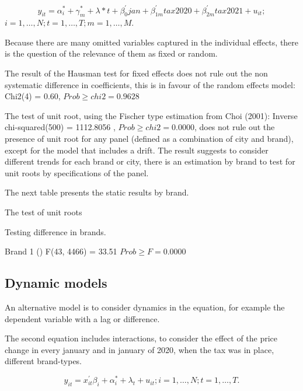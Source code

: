 \documentclass[]{article}
\begin{document}
\begin{equation*} 
	y_{it}  = \alpha_{i}^{*} + \gamma_{m}^{*} + \lambda*t + \beta_{0}^{'}jan + \beta_{1m}^{'}tax2020 + \beta_{2m}^{'}tax2021 + u_{it}
	;   \tag{4.2}
\end{equation*}
$i  = 1,\ldots,N;  t=1,\ldots,T; m=1,\ldots,M. $

Because there are many omitted variables captured in the individual effects, there is the question of the relevance of them as fixed or random.

The result of the Hausman test for fixed effects does not rule out the non systematic difference in coefficients, this is in favour of the random effects model: Chi2(4) =  0.60,
$Prob \geq chi2 =    0.9628$

The test of unit root, using the Fischer type estimation from Choi (2001): 
Inverse chi-squared(500) = 1112.8056 , $Prob \geq chi2 =    0.0000$, does not rule out the presence of unit root for any panel (defined as a combination of city and brand), except for the model that includes a drift. The result suggests to consider different trends for each brand or city, there is an estimation by brand to test for unit roots by specifications of the panel.

The next table presents the static results by brand.

\begin{landscape}

\end{landscape}

%
The test of unit roots

Testing difference in brands.

Brand 1 ()
 F(43, 4466) = 33.51                   
$ Prob \geq F = 0.0000 $

%
 
\subsection{Dynamic models}
An alternative model is to consider dynamics in the equation, for example the dependent variable with a lag or difference. 

The second equation includes interactions, to consider the effect of the price change in every january and in january of 2020, when the tax was in place, different brand-types.

\begin{equation*}
	y_{it} = x_{it}^{'} \beta_{i} + \alpha_{i}^{*} + \lambda_{t} + u_{it}; i = 1,\ldots,N; t=1,\ldots,T.
\end{equation*}
\end{document}
